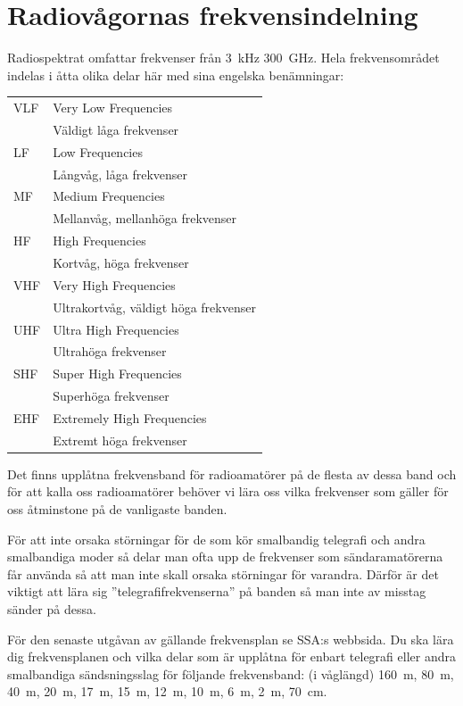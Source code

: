 \section{Radiovågornas frekvensindelning}

Radiospektrat omfattar frekvenser från \SI{3}{kHz} \SI{300}{GHz}. Hela frekvensområdet indelas i åtta olika delar här med sina engelska benämningar:

\begin{tabularx}{\columnwidth}{lX}
	VLF & Very Low Frequencies                  \\ 
	    & Väldigt låga frekvenser               \\
	LF  & Low Frequencies                       \\
	    & Långvåg, låga frekvenser              \\
	MF  & Medium Frequencies                    \\
	    & Mellanvåg, mellanhöga frekvenser      \\
	HF  & High Frequencies                      \\
	    & Kortvåg, höga frekvenser              \\
	VHF & Very High Frequencies                 \\
	    & Ultrakortvåg, väldigt höga frekvenser \\
	UHF & Ultra High Frequencies                \\
	    & Ultrahöga frekvenser                  \\
	SHF & Super High Frequencies                \\
	    & Superhöga frekvenser                  \\
	EHF & Extremely High Frequencies            \\
	    & Extremt höga frekvenser
\end{tabularx}

Det finns upplåtna frekvensband för radioamatörer på de flesta av dessa band och för att kalla oss radioamatörer behöver vi lära oss vilka frekvenser som gäller för oss åtminstone på de vanligaste banden. 

För att inte orsaka störningar för de som kör smalbandig telegrafi och andra smalbandiga moder så delar man ofta upp de frekvenser som sändaramatörerna får använda så att man inte skall orsaka störningar för varandra. Därför är det viktigt att lära sig ''telegrafifrekvenserna'' på banden så man inte av misstag sänder på dessa.

För den senaste utgåvan av gällande frekvensplan se SSA:s webbsida. Du ska lära dig frekvensplanen och vilka delar som är upplåtna för enbart telegrafi eller andra smalbandiga sändsningsslag för följande frekvensband: (i våglängd) \SI{160}{m}, \SI{80}{m}, \SI{40}{m}, \SI{20}{m}, \SI{17}{m}, \SI{15}{m}, \SI{12}{m}, \SI{10}{m}, \SI{6}{m}, \SI{2}{m}, \SI{70}{cm}. 


